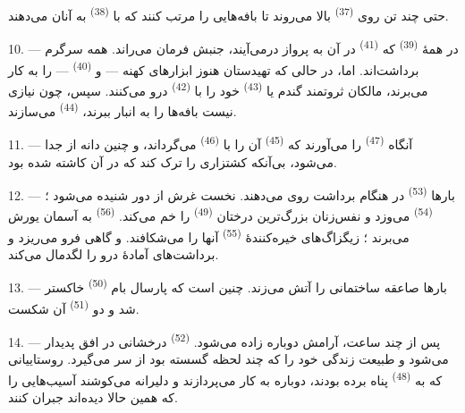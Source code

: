 حتی چند تن روی  \textsuperscript{(37)} بالا می‌روند تا
بافه‌هایی را مرتب کنند که با  \textsuperscript{(38)} به
آنان می‌دهند.

10. --- در همهٔ  \textsuperscript{(39)} که
 \textsuperscript{(41)} در آن به پرواز درمی‌آیند،
جنبش فرمان می‌راند. همه سرگرم برداشت‌اند. اما، در حالی که تهیدستان
هنوز ابزارهای کهنه —  و 
\textsuperscript{(40)} — را به کار می‌برند، مالکان ثروتمند گندم یا
 \textsuperscript{(43)} خود را با 
\textsuperscript{(42)} درو می‌کنند. سپس، چون نیازی نیست بافه‌ها را به
انبار ببرند،  \textsuperscript{(44)} می‌سازند.

11. --- آنگاه  \textsuperscript{(47)} را
می‌آورند که  \textsuperscript{(45)} آن را با
 \textsuperscript{(46)} می‌گرداند، و چنین دانه از
 جدا می‌شود، بی‌آنکه کشتزاری را ترک کند که در آن کاشته شده
بود.

\VUsaut{5.0mm}
\VUsaut{3.4mm}

12. --- بارها  \textsuperscript{(53)} در هنگام
برداشت روی می‌دهند. نخست غرش  از دور شنیده می‌شود ؛
 \textsuperscript{(54)} می‌وزد و نفس‌زنان
بزرگ‌ترین درختان  \textsuperscript{(49)} را خم می‌کند.
 \textsuperscript{(56)} به آسمان یورش می‌برند ؛
زیگزاگ‌های خیره‌کنندهٔ  \textsuperscript{(55)} آنها را
می‌شکافند.  و گاهی  فرو می‌ریزد و
برداشت‌های آمادهٔ درو را لگدمال می‌کند.

13. --- بارها صاعقه ساختمانی را آتش می‌زند. چنین است که پارسال بام
 \textsuperscript{(50)} خاکستر شد و دو
 \textsuperscript{(51)} آن شکست.

14. --- پس از چند ساعت، آرامش دوباره زاده می‌شود. 
\textsuperscript{(52)} درخشانی در افق پدیدار می‌شود و طبیعت زندگی خود
را که چند لحظه گسسته بود از سر می‌گیرد. روستاییانی که به 
\textsuperscript{(48)} پناه برده بودند، دوباره به کار می‌پردازند و
دلیرانه می‌کوشند آسیب‌هایی را که همین حالا دیده‌اند جبران کنند.

\VUsaut{6.0mm}
\VUsaut{3.6mm}

\VUsaut{1.4mm}
\VUsaut{4.0mm}

